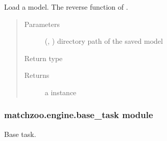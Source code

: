\documentclass[letterpaper,10pt,english]{sphinxmanual}
\begin{document}

\begin{fulllineitems}
\label{\detokenize{matchzoo.engine:matchzoo.engine.base_model.load_model}}
Load a model. The reverse function of {\hyperref[\detokenize{matchzoo.engine:matchzoo.engine.base_model.BaseModel.save}]{}}.
\begin{quote}\begin{description}
\item[{Parameters}] \leavevmode
{} (\sphinxcode{\sphinxupquote{Union}}{[}, \sphinxcode{\sphinxupquote{Path}}{]}) \textendash{} directory path of the saved model

\item[{Return type}] \leavevmode
{\hyperref[\detokenize{matchzoo.engine:matchzoo.engine.base_model.BaseModel}]{}}

\item[{Returns}] \leavevmode
a {\hyperref[\detokenize{matchzoo.engine:matchzoo.engine.base_model.BaseModel}]{}} instance

\end{description}\end{quote}

\end{fulllineitems}



\subsubsection{matchzoo.engine.base\_task module}
\label{\detokenize{matchzoo.engine:module-matchzoo.engine.base_task}}\label{\detokenize{matchzoo.engine:matchzoo-engine-base-task-module}}
Base task.
\end{document}
